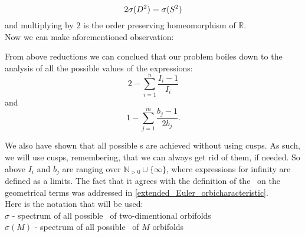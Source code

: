 \begin{equation}\label{times_two_fact}
2{\mathcal{\sigma}(D^2)}={\mathcal{\sigma}(S^2)}
\end{equation}
and multiplying by $2$ is the order preserving homeomorphism of $\mathbb{R}$. \\[16pt]
Now we can make aforementioned observation:
\begin{observation}\label{boils_down}
From above reductions we can conclued that our problem boiles down to the analysis of all
 the possible 
values of the expressions:
\begin{equation}\label{S2_sum}
2 - \sum_{i=1}^n \frac{I_i-1}{I_i}
\end{equation}
and 
\begin{equation}
1 - \sum_{j=1}^m \frac{b_j-1}{2b_j}.
\end{equation}
\end{observation}
We also have shown that all possible \Eoc s are achieved without using cusps. As such, we will use 
cusps, remembering, that we can always get rid of them, if needed. So above $I_i$ and $b_j$ 
are ranging over $\mathbb{N}_{>0}\cup \{\infty\}$, where expressions for infinity are defined as 
a limits. The fact that it agrees with the definition of the \Eoc\ on the geometrical terms was 
addressed in \ref{extended_Euler_orbicharacteristic}. \\
Here is the notation that will be used: \\
$\sigma$ - spectrum of all possible \Eoc\ of two-dimentional orbifolds \\
$\sigma(M)$ - spectrum of all possible \Eoc\ of $M$ orbifolds \\


